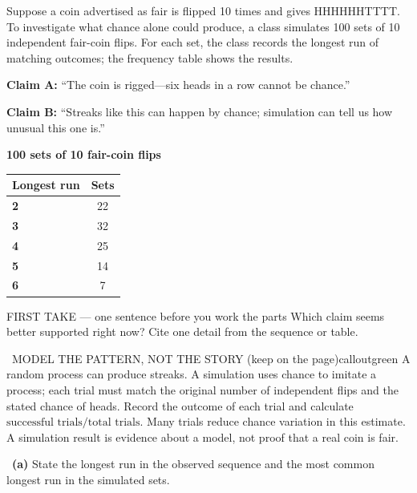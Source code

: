\documentclass[11pt]{article}
\begin{document}
Suppose a coin advertised as fair is flipped 10 times and gives HHHHHHTTTT. To investigate what chance alone could produce, a class simulates 100 sets of 10 independent fair-coin flips. For each set, the class records the longest run of matching outcomes; the frequency table shows the results.\par\smallskip \textbf{Claim A:} ``The coin is rigged---six heads in a row cannot be chance.''\par \textbf{Claim B:} ``Streaks like this can happen by chance; simulation can tell us how unusual this one is.''\par
\begin{center}
\textbf{100 sets of 10 fair-coin flips}\par\smallskip
\begin{tabular}{|l|c|}
\hline
\textbf{Longest run} & \textbf{Sets} \\ \hline
\textbf{2} & 22 \\ \hline
\textbf{3} & 32 \\ \hline
\textbf{4} & 25 \\ \hline
\textbf{5} & 14 \\ \hline
\textbf{6} & 7 \\ \hline
\end{tabular}
\end{center}
\begin{firsttakebox}{FIRST TAKE --- one sentence before you work the parts}
Which claim seems better supported right now? Cite one detail from the sequence or table.\par
{}
\end{firsttakebox}

\begin{callout}{\IconBook\ MODEL THE PATTERN, NOT THE STORY (keep on the page)}{calloutgreen}
A random process can produce streaks. A simulation uses chance to imitate a process; each trial must match the original number of independent flips and the stated chance of heads. Record the outcome of each trial and calculate $\text{successful trials}/\text{total trials}$. Many trials reduce chance variation in this estimate. A simulation result is evidence about a model, not proof that a real coin is fair.
\end{callout}

~\textbf{(a)} State the longest run in the observed sequence and the most common longest run in the simulated sets.\par
{}
\end{document}
